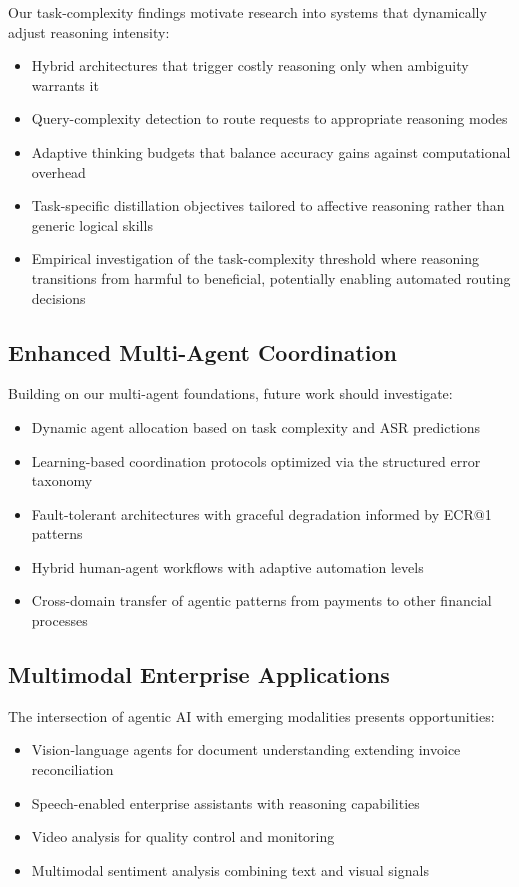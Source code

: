 Our task-complexity findings motivate research into systems that dynamically adjust reasoning intensity:
\begin{itemize}[leftmargin=*]
    \item Hybrid architectures that trigger costly reasoning only when ambiguity warrants it
    \item Query-complexity detection to route requests to appropriate reasoning modes
    \item Adaptive thinking budgets that balance accuracy gains against computational overhead
    \item Task-specific distillation objectives tailored to affective reasoning rather than generic logical skills
    \item Empirical investigation of the task-complexity threshold where reasoning transitions from harmful to beneficial, potentially enabling automated routing decisions
\end{itemize}

\subsection{Enhanced Multi-Agent Coordination}

Building on our multi-agent foundations, future work should investigate:
\begin{itemize}[leftmargin=*]
    \item Dynamic agent allocation based on task complexity and ASR predictions
    \item Learning-based coordination protocols optimized via the structured error taxonomy
    \item Fault-tolerant architectures with graceful degradation informed by ECR@1 patterns
    \item Hybrid human-agent workflows with adaptive automation levels
    \item Cross-domain transfer of agentic patterns from payments to other financial processes
\end{itemize}

\subsection{Multimodal Enterprise Applications}

The intersection of agentic AI with emerging modalities presents opportunities:
\begin{itemize}[leftmargin=*]
    \item Vision-language agents for document understanding extending invoice reconciliation
    \item Speech-enabled enterprise assistants with reasoning capabilities
    \item Video analysis for quality control and monitoring
    \item Multimodal sentiment analysis combining text and visual signals
\end{itemize}

